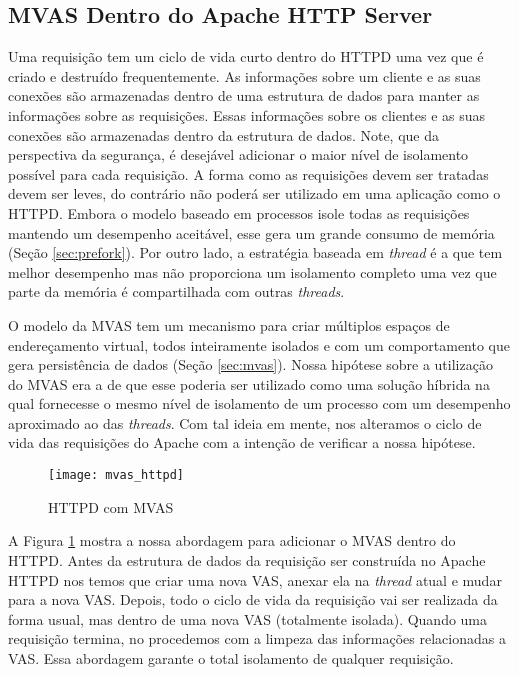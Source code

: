 \subsection{MVAS Dentro do Apache HTTP Server}

Uma requisição tem um ciclo de vida curto dentro do HTTPD uma vez que é criado
e destruído frequentemente. As informações sobre um cliente e as suas conexões
são armazenadas dentro de uma estrutura de dados para manter as informações
sobre as requisições. Essas informações sobre os clientes e as suas conexões
são armazenadas dentro da estrutura de dados. Note, que da perspectiva da
segurança, é desejável adicionar o maior nível de isolamento possível para cada
requisição. A forma como as requisições devem ser tratadas devem ser leves, do
contrário não poderá ser utilizado em uma aplicação como o HTTPD. Embora o
modelo baseado em processos isole todas as requisições mantendo um desempenho
aceitável, esse gera um grande consumo de memória (Seção \ref{sec:prefork}).
Por outro lado, a estratégia baseada em \emph{thread} é a que tem melhor
desempenho mas não proporciona um isolamento completo uma vez que parte da
memória é compartilhada com outras \emph{threads}.

O modelo da MVAS tem um mecanismo para criar múltiplos espaços de endereçamento
virtual, todos inteiramente isolados e com um comportamento que gera
persistência de dados (Seção \ref{sec:mvas}). Nossa hipótese sobre a utilização
do MVAS era a de que esse poderia ser utilizado como uma solução híbrida na
qual fornecesse o mesmo nível de isolamento de um processo com um desempenho
aproximado ao das \emph{threads}. Com tal ideia em mente, nos alteramos o ciclo
de vida das requisições do Apache com a intenção de verificar a nossa hipótese.

\begin{figure}[!h] \centering \texttt{[image: mvas\_httpd]}
\caption{HTTPD com MVAS} \label{fig:httpd_mvas} \end{figure}

A Figura \ref{fig:httpd_mvas} mostra a nossa abordagem para adicionar o MVAS
dentro do HTTPD. Antes da estrutura de dados da requisição ser construída no
Apache HTTPD nos temos que criar uma nova VAS, anexar ela na \emph{thread}
atual e mudar para a nova VAS. Depois, todo o ciclo de vida da requisição vai
ser realizada da forma usual, mas dentro de uma nova VAS (totalmente isolada).
Quando uma requisição termina, no procedemos com a limpeza das informações
relacionadas a VAS. Essa abordagem garante o total isolamento de qualquer
requisição.

